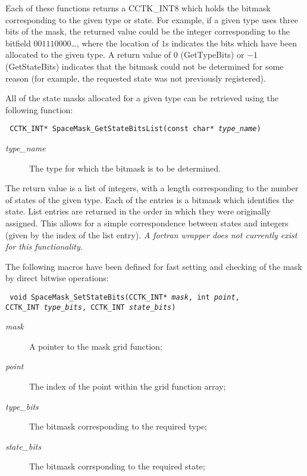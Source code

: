 \documentclass{article}
\begin{document}
\noindent Each of these functions returns a CCTK\_INT8 which holds the
bitmask corresponding to the given type or state. For example, if a
given type uses three bits of the mask, the returned value could be
the integer corresponding to the bitfield $001110000$\ldots, where the
location of $1$s indicates the bits which have been allocated to the
given type. A return value of $0$ (GetTypeBits) or $-1$ (GetStateBits)
indicates that the bitmask could
not be determined for some reason (for example, the requested state
was not previously registered).

All of the state masks allocated for a given type can be retrieved
using the following function:

\indent\parbox{\linewidth}{
\vspace{\baselineskip}\noindent\texttt{
CCTK\_INT* SpaceMask\_GetStateBitsList(const char* \emph{type\_name})
}\\
\hspace*{10mm}\parbox{\linewidth}{
\begin{description}
  \item[\emph{type\_name}] The type for which the bitmask is to be
  determined.
\end{description}
}}

The return value is a list of integers, with a length corresponding to
the number of states of the given type. Each of the entries is a
bitmask which identifies the state. List entries are returned in the
order in which they were originally assigned. This allows for a simple
correspondence between states and integers (given by the index of the
list entry). \emph{A fortran wrapper does not currently exist for this
functionality.}

The following macros have been defined for fast setting and checking
of the mask by direct bitwise operations:

\indent\parbox{\linewidth}{
\vspace{\baselineskip}\noindent\texttt{
void SpaceMask\_SetStateBits(CCTK\_INT* \emph{mask}, int \emph{point},
  \\\hspace*{10mm}
  CCTK\_INT \emph{type\_bits}, CCTK\_INT \emph{state\_bits})
}\\
\hspace*{10mm}\parbox{\linewidth}{
\begin{description}
  \item[\emph{mask}] A pointer to the mask grid function;
  \item[\emph{point}] The index of the point within the grid function
    array;
  \item[\emph{type\_bits}] The bitmask corresponding to the required
    type;
  \item[\emph{state\_bits}] The bitmask corrsponding to the required
    state;
\end{description}
}}
\end{document}
